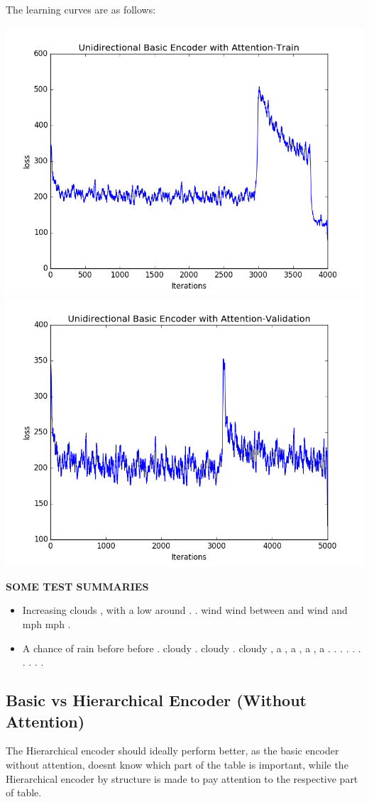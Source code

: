 \documentclass[12pt]{report}
\begin{document}
The learning curves are as follows:
\begin{center}
\includegraphics[scale=0.5]{uni_basic_train.png}
\includegraphics[scale=0.5]{uni_basic_val.png}
\end{center}
\textbf{SOME TEST SUMMARIES}
\begin{itemize}
\item Increasing clouds , with a low around . . wind wind between and wind and mph mph . 
\item A chance of rain before before . cloudy . cloudy . cloudy , a , a , a , a . . . . . . . . . . 
 
\end{itemize}
\subsection{Basic vs Hierarchical Encoder (Without Attention)}
The Hierarchical encoder should ideally perform better, as the basic encoder without attention, doesnt know which part of the table is important, while the Hierarchical encoder by structure is made to pay attention to the respective part of table.
\end{document}
